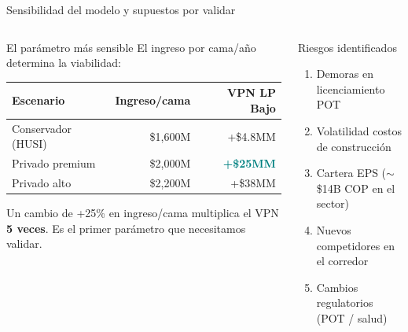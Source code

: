 \documentclass[aspectratio=169, 11pt]{beamer}
\newcommand{\highlight}[1]{\textcolor{teal}{\textbf{#1}}}
\begin{document}
{
\begin{frame}{Sensibilidad del modelo y supuestos por validar}

\begin{columns}[T]
\begin{alertblock}{\small El parámetro más sensible}
\scriptsize El ingreso por cama/año determina la viabilidad:

\vspace{3pt}
{\scriptsize
\begin{tabular}{@{}lrr@{}}
\toprule
\textbf{Escenario} & \textbf{Ingreso/cama} & \textbf{VPN LP Bajo} \\
\midrule
\rowcolor{coral!6}
Conservador (HUSI) & \$1,600M & +\$4.8MM \\
\rowcolor{teal!6}
Privado premium & \$2,000M & \highlight{+\$25MM} \\
Privado alto & \$2,200M & +\$38MM \\
\bottomrule
\end{tabular}
}

\vspace{3pt}
{\scriptsize Un cambio de +25\% en ingreso/cama multiplica el VPN \textbf{5 veces}. Es el primer parámetro que necesitamos validar.}
\end{alertblock}

\vspace{3pt}
\begin{block}{\small Riesgos identificados}
\scriptsize
\begin{enumerate}\setlength{\itemsep}{0pt}
  \item Demoras en licenciamiento POT
  \item Volatilidad costos de construcción
  \item Cartera EPS ($\sim$\$14B COP en el sector)
  \item Nuevos competidores en el corredor
  \item Cambios regulatorios (POT / salud)
\end{enumerate}
\end{block}


\end{columns}
\end{frame}}
\end{document}
